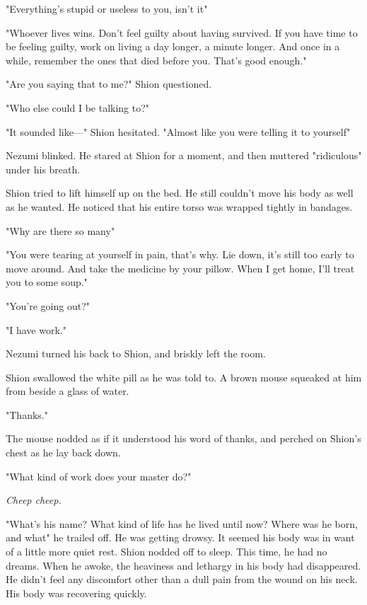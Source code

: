 "Everything's stupid or useless to you, isn't it\el "

"Whoever lives wins. Don't feel guilty about having survived. If you
have time to be feeling guilty, work on living a day longer, a minute
longer. And once in a while, remember the ones that died before you.
That's good enough."

"Are you saying that to me?" Shion questioned.

"Who else could I be talking to?"

"It sounded like---" Shion hesitated. "Almost like you were telling it to
yourself\el "

Nezumi blinked. He stared at Shion for a moment, and then muttered
"ridiculous" under his breath.

Shion tried to lift himself up on the bed. He still couldn't move his
body as well as he wanted. He noticed that his entire torso was wrapped
tightly in bandages.

"Why are there so many\el "

"You were tearing at yourself in pain, that's why. Lie down, it's still
too early to move around. And take the medicine by your pillow. When I
get home, I'll treat you to some soup."

"You're going out?"

"I have work."

Nezumi turned his back to Shion, and briskly left the room.

Shion swallowed the white pill as he was told to. A brown mouse squeaked
at him from beside a glass of water.

"Thanks."

The mouse nodded as if it understood his word of thanks, and perched on
Shion's chest as he lay back down.

"What kind of work does your master do?"

\emph{Cheep cheep.}

"What's his name? What kind of life has he lived until now? Where was he
born, and what\el " he trailed off. He was getting drowsy. It seemed his
body was in want of a little more quiet rest. Shion nodded off to sleep.
This time, he had no dreams. When he awoke, the heaviness and lethargy
in his body had disappeared. He didn't feel any discomfort other than a
dull pain from the wound on his neck. His body was recovering quickly.

